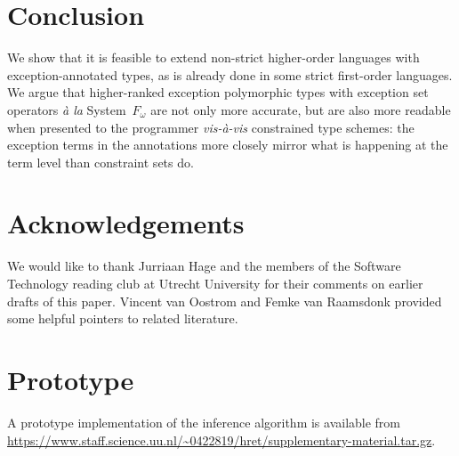 \documentclass{llncs}
\begin{document}
\section{Conclusion}

We show that it is feasible to extend non-strict higher-order languages with exception-annotated types, as is already done in some strict first-order languages. We argue that higher-ranked exception polymorphic types with exception set operators \emph{\`a la} System~$F_\omega$ are not only more accurate, but are also more readable when presented to the programmer \emph{vis-\`a-vis} constrained type schemes: the exception terms in the annotations more closely mirror what is happening at the term level than constraint sets do.

\section*{Acknowledgements}
We would like to thank Jurriaan Hage and the members of the Software Technology reading club at Utrecht University for their comments on earlier drafts of this paper. Vincent van Oostrom and Femke van Raamsdonk provided some helpful pointers to related literature.


%

\renewcommand{\bibname}{}   %
\small                      %



%


%
%



\clearpage

\appendix

\section{Prototype}

A prototype implementation of the inference algorithm is available from \url{https://www.staff.science.uu.nl/~0422819/hret/supplementary-material.tar.gz}.
\end{document}
